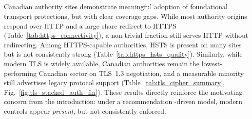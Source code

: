 \documentclass[pdflatex,sn-mathphys-num]{sn-jnl}
\numberwithin{equation}{section}
\theoremstyle{thmstyleone}
\theoremstyle{thmstyletwo}%
\theoremstyle{thmstylethree}%
\begin{document}
\subsection{\color{red}{Restate and Answer Main Questions}}



\paragraph{\color{red}{RQ1: To what extent do Canadian public-sector and critical web services implement key recommended controls?}}
Canadian authority sites demonstrate meaningful adoption of foundational transport protections, but with clear
coverage gaps. While most authority origins respond over HTTP and a large share redirect to HTTPS
(Table~\ref{tab:https_connectivity}), a non-trivial fraction still serves
HTTP without redirecting. Among HTTPS-capable authorities, HSTS is present on many sites but is not consistently
strong (Table~\ref{tab:https_hsts_quality}). Similarly,
while modern TLS is widely available, Canadian
authorities remain the lowest-performing Canadian sector on TLS~1.3 negotiation, and a measurable minority still advertises 
legacy protocol support
(Table~\ref{tab:tls_cipher_summary}, Fig.~\ref{fig:tls_stacked_auth_fin}). These results directly reinforce
the motivating concern from the introduction: under a recommendation
-driven model, modern controls appear \emph{present}, but not consistently enforced.

\end{document}
